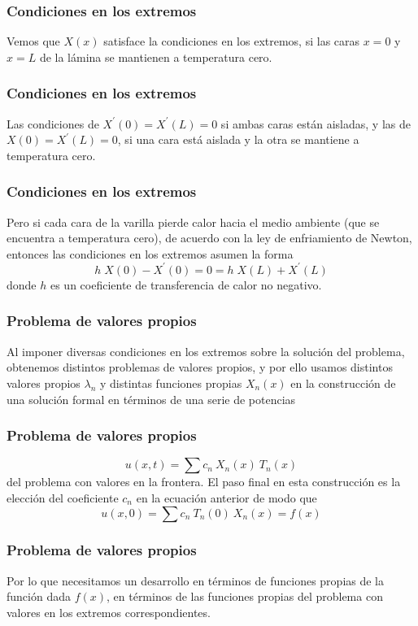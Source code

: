\begin{frame}
\frametitle{Condiciones en los extremos}
Vemos que $X(x)$ satisface la condiciones en los extremos, si las caras $x=0$ y $x=L$ de la lámina se mantienen a temperatura cero.
\end{frame}
\begin{frame}
\frametitle{Condiciones en los extremos}
Las condiciones de $X^{\prime}(0) = X^{\prime}(L) = 0$ si ambas caras están aisladas, y las de $X(0) = X^{\prime}(L) = 0$, si una cara está aislada y la otra se mantiene a temperatura cero.
\end{frame}
\begin{frame}
\frametitle{Condiciones en los extremos}
Pero si cada cara de la varilla pierde calor hacia el medio ambiente (que se encuentra a temperatura cero), de acuerdo con la ley de enfriamiento de Newton, entonces las condiciones en los extremos asumen la forma
\[h \; X(0) - X^{\prime}(0) = 0 = h \; X(L) + X^{\prime}(L)\]
donde $h$ es un coeficiente de transferencia de calor no negativo.
\end{frame}
\begin{frame}
\frametitle{Problema de valores propios}
Al imponer diversas condiciones en los extremos sobre la solución del problema, obtenemos distintos problemas de valores propios, y por ello usamos distintos valores propios ${\lambda_{n}}$ y distintas funciones propias $X_{n}(x)$ en la construcción de una solución formal en términos de una serie de potencias
\end{frame}
\begin{frame}
\frametitle{Problema de valores propios}
\[ u(x, t) = \sum c_{n} \: X_{n}(x) \: T_{n}(x)\]
del problema con valores en la frontera. El paso final en esta construcción es la elección del coeficiente ${c_{n}}$ en la ecuación anterior de modo que
\[u(x,0) = \sum c_{n} \: T_{n}(0) \: X_{n}(x)= f(x) \]
\end{frame}
\begin{frame}
\frametitle{Problema de valores propios}
Por lo que necesitamos un desarrollo en términos de funciones propias de la función dada $f(x)$, en términos de las funciones propias del problema con valores en los extremos correspondientes.
\end{frame}
